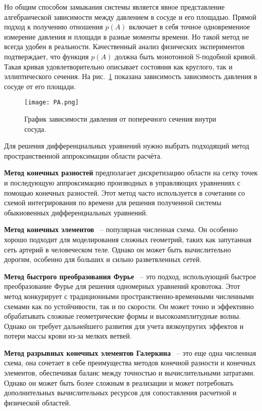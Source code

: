 Но общим способом замыкания системы является явное представление алгебраической зависимости
между давлением в сосуде и его площадью. Прямой подход к получению отношения $p(A)$ включает в себя точное одновременное измерение
давления и площади в разные моменты времени. Но такой метод не всегда удобен в реальности.
Качественный анализ физических экспериментов подтверждает, что функция $p(A)$ должна быть монотонной S-подобной кривой. 
Такая кривая удовлетворительно описывает состояния как круглого, так и эллиптического сечения. На рис.~\ref{ych} показана зависимость
зависимость давления в сосуде от его площади.


\begin{figure}[h]
    \centering
    \texttt{[image: PA.png]}
    \caption{График зависимости давления от поперечного сечения внутри сосуда.}
    \label{ych}
\end{figure}

Для решения дифференциальных уравнений нужно выбрать подходящий метод пространственной аппроксимации области расчёта.

{\bf Метод конечных разностей} предполагает дискретизацию области на сетку точек и последующую аппроксимацию производных в управляющих
уравнениях с помощью конечных разностей. Этот метод часто используется в сочетании со схемой интегрирования по времени для решения 
полученной системы обыкновенных дифференциальных уравнений.

{\bf Метод конечных элементов}~\cite{TAYLOR1998} -- популярная численная схема. 
Он особенно хорошо подходит для моделирования сложных геометрий, таких как запутанная сеть артерий в человеческом теле. 
Однако он может быть вычислительно дорогим, особенно для больших и сильно разветвленных сетей. 

{\bf Метод быстрого преобразования Фурье}~\cite{Sazonov:2019} -- 
это подход, использующий быстрое преобразование Фурье для решения одномерных уравнений кровотока. 
Этот метод конкурирует с традиционными пространственно-временными численными схемами как по устойчивости, так и по скорости. 
Он может точно и эффективно обрабатывать сложные геометрические формы и высокоамплитудные волны. 
Однако он требует дальнейшего развития для учета вязкоупругих эффектов и потери массы крови из-за мелких ветвей. 

{\bf Метод разрывных конечных элементов Галеркина}~\cite{yao:2017} -- это еще одна численная схема, она сочетает в себе преимущества методов конечной разности и конечных элементов, 
обеспечивая баланс между точностью и вычислительными затратами. Однако он может быть более сложным в реализации и может
потребовать дополнительных вычислительных ресурсов для сопоставления расчетной и физической областей.

